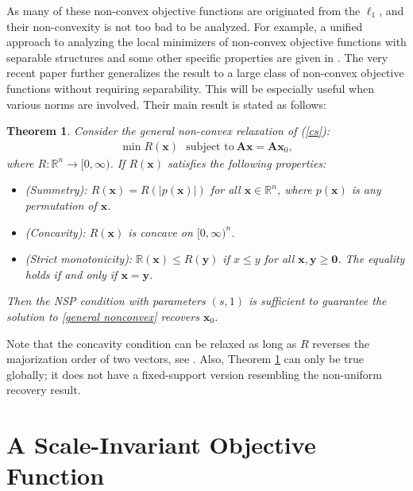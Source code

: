 \documentclass[11pt]{article}
\numberwithin{equation}{section}
\theoremstyle{plain}
\newtheorem{Th}{Theorem}[section]
\theoremstyle{definition}
\def\R{{\mathbb R}}
\def\R{{\mathbb R}}
\def\A{{\mathbf A}}
\def\x{{\mathbf x}}
\def\y{{\mathbf{y}}}
\begin{document}
As many of these non-convex objective functions are originated from the $\ell_1$, and their non-convexity is not too bad to be analyzed. For example, a unified approach to analyzing the local minimizers of non-convex objective functions with separable structures and some other specific properties are given in \cite{lv2009unified}. The very recent paper \cite{tran2017unified} further generalizes the result to a large class of non-convex objective functions without requiring separability. This will be especially useful when various norms are involved. Their main result is stated as follows:
\begin{Th}\label{general nonconxe Th}
Consider the general non-convex relaxation of (\ref{cs}):
\begin{align}
\min R(\x) \ \ \ \text{subject to}\ \A\x=\A\x_0,\label{general nonconvex}
\end{align}
where $R:\R^n\rightarrow [0, \infty)$. If $R(\x)$ satisfies the following properties:
\begin{itemize}
\item (Summetry): $R(\x)=R(|p(\x)|)$ for all $\x\in\R^n$, where $p(\x)$ is any permutation of $\x$. 
\item (Concavity): $R(\x)$ is concave on $[0,\infty)^n$.  
\item (Strict monotonicity): $\R(\x)\leq R(\y)$ if $x\leq y$ for all $\x, \y\geq \mathbf{0}$. The equality holds if and only if $\x=\y$.  
\end{itemize}
Then the NSP condition with parameters $(s,1)$ is sufficient to guarantee the solution to \ref{general nonconvex} recovers $\x_0$. 
\end{Th}
Note that the concavity condition can be relaxed as long as $R$ reverses the majorization order of two vectors, see \cite{tran2017unified}. Also, Theorem \ref{general nonconxe Th} can only be true globally; it does not have a fixed-support version resembling the non-uniform recovery result.  



    

\section{A Scale-Invariant Objective Function}
\end{document}
